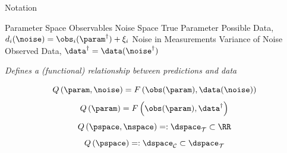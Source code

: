 \begin{block}{Notation}
\large
    \begin{itemize}
         Parameter Space
         Observables
         Noise Space
        \itembox{$\param^\dagger\in\pspace$} True Parameter
         Possible Data, $d_i(\noise) = \obs_i(\param^\dagger) + \xi_i$
        \itembox{$\noise^\dagger\in\nspace$} Noise in Measurements
        \itembox{$ \sigma $} Variance of Noise
         Observed Data, $\data^\dagger = \data(\noise^\dagger)$
    \end{itemize}

\end{block}

\centering
\vspace{1cm}
\vspace{1cm}
    \emph{\large Defines a (functional) relationship between predictions and data}

        $$Q \left (\param, \noise \right ) = F \left ( \obs(\param), \data(\noise) \right ) $$
        $$Q \left (\param \right ) = F \left ( \obs(\param), \data^\dagger \right )$$
        $$Q \left ( \pspace, \nspace \right ) =: \dspace_\mathcal{T} \subset \RR$$
        $$Q \left ( \pspace \right ) =: \dspace_\mathcal{C} \subset \dspace_\mathcal{T}$$

